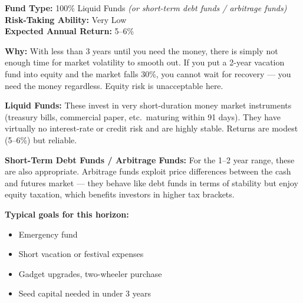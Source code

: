 \documentclass[12pt,a4paper]{article}
\begin{document}
\begin{tcolorbox}[base, colback=ShortTerm!8, colframe=ShortTerm,
  colbacktitle=ShortTerm, coltitle=white, fonttitle=\bfseries,
  title={Horizon 1: Below 3 Years --- Safety First}]

\textbf{Fund Type:} 100\% Liquid Funds \textit{(or short-term debt funds / arbitrage funds)}\\
\textbf{Risk-Taking Ability:} Very Low\\
\textbf{Expected Annual Return:} 5--6\%

\medskip
\textbf{Why:} With less than 3 years until you need the money, there is simply not enough time for market volatility to smooth out. If you put a 2-year vacation fund into equity and the market falls 30\%, you cannot wait for recovery --- you need the money regardless. Equity risk is unacceptable here.

\medskip
\textbf{Liquid Funds:} These invest in very short-duration money market instruments (treasury bills, commercial paper, etc.\ maturing within 91 days). They have virtually no interest-rate or credit risk and are highly stable. Returns are modest (5--6\%) but reliable.

\medskip
\textbf{Short-Term Debt Funds / Arbitrage Funds:} For the 1--2 year range, these are also appropriate. Arbitrage funds exploit price differences between the cash and futures market --- they behave like debt funds in terms of stability but enjoy equity taxation, which benefits investors in higher tax brackets.

\medskip
\textbf{Typical goals for this horizon:}
\begin{itemize}
  \item Emergency fund
  \item Short vacation or festival expenses
  \item Gadget upgrades, two-wheeler purchase
  \item Seed capital needed in under 3 years
\end{itemize}
\end{tcolorbox}

\vspace{3mm}
\end{document}
